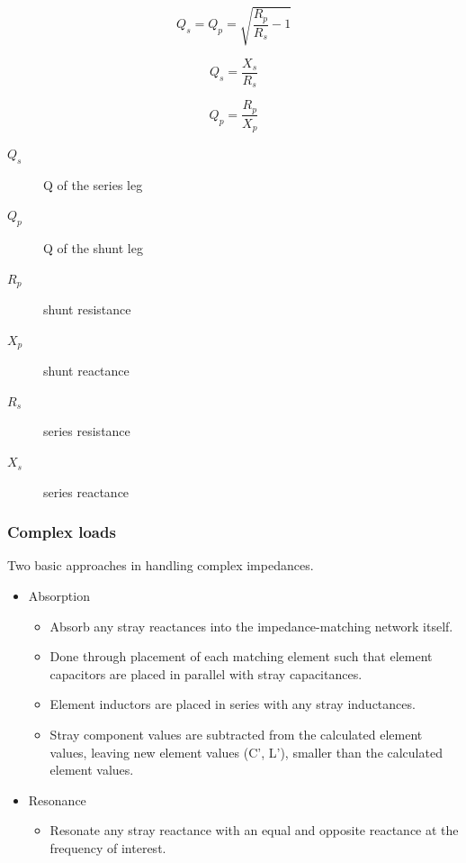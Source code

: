 \begin{equation}
Q_s = Q_p = \sqrt{\dfrac{R_p}{R_s}-1}
\end{equation}

\begin{equation}
Q_s = \dfrac{X_s}{R_s}
\end{equation}

\begin{equation}
Q_p = \dfrac{R_p}{X_p}
\end{equation}

\begin{description}
	\item[$Q_s$] Q of the series leg
	\item[$Q_p$] Q of the shunt leg
	\item[$R_p$] shunt resistance
	\item[$X_p$] shunt reactance
	\item[$R_s$] series resistance
	\item[$X_s$] series reactance
\end{description}

\subsubsection{Complex loads}
Two basic approaches in handling complex impedances.
\begin{itemize}
	\item Absorption
	\begin{itemize}
		\item Absorb any stray reactances into the impedance-matching network itself.
		\item Done through placement of each matching element such that element capacitors are placed in parallel with stray capacitances.
		\item Element inductors are placed in series with any stray inductances. 
		\item Stray component values are subtracted from the calculated element
		values, leaving new element values (C', L'), smaller than the calculated element values.
	\end{itemize}
	\item Resonance
	\begin{itemize}
		\item Resonate any stray reactance with an	equal and opposite reactance at the frequency of interest.
	\end{itemize}
\end{itemize}

